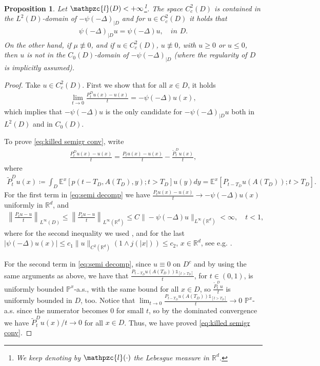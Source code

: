 \documentclass[reqno]{amsart}
\newtheorem{proposition}[theorem]{Proposition}
\theoremstyle{remark}
\numberwithin{equation}{section} %
\newcommand{\R}{\mathbb{R}}
\newcommand{\Lpsi}{\psi(-\Delta)}
\newcommand{\LpsiD}{\Lpsi_{|D}}
\newcommand{\wt}{\widetilde}
\newcommand{\1}{\mathds{1}}
\begin{document}
	\begin{proposition}\label{p:generator domain}
		Let $\mathpzc{l}(D)<+\infty$\footnote{We keep denoting by $\mathpzc{l}(\cdot)$ the Lebesgue measure in $\R^d$.}. The space $C_c^2(D)$ is contained in the $L^2(D)$-domain of $-\LpsiD$ and for $u\in C_c^2(D)$ it holds that
		\begin{align*}
			\LpsiD u=\Lpsi u,\quad \textit{in $D$}.
		\end{align*}
		On the other hand, if $\mu\not\equiv0$, and if $u\in C_c^2(D)$, $u\not\equiv 0$, with $u\ge0$ or $u\le 0$, then $u$ is not in the $C_0(D)$-domain of $-\LpsiD$ (where the regularity of $D$ is implicitly assumed).
	\end{proposition}
	\begin{proof}
		Take $u\in C_c^2(D)$. First we show that for all $x\in D$, it holds
		\begin{align}\label{eq:killed semigr conv}
			\lim_{t\to0}\frac{ P^D_tu(x)-u(x)}{t}=-\Lpsi u(x),
		\end{align}
		which implies that $-\Lpsi u$ is the only candidate for $-\LpsiD u$ both in $L^2(D)$ and in $C_0(D)$.
		
		To prove \eqref{eq:killed semigr conv}, write
		\begin{align}\label{eq:semi decomp}
			\frac{ P^D_tu(x)-u(x)}{t}=\frac{P_tu(x)-u(x)}{t}-\frac{\wt  P^D_tu(x)}{t},
		\end{align}
		where
		\begin{align}\label{eq:remainder of semigr}
			\wt  P^D_tu(x)\coloneqq \int_D \mathds{E}^x\left[p(t-T_D,A({T_D}),y);t>T_D\right]u(y)dy=\mathds{E}^x\left[P_{t-T_D}u(A({T_D}));t>T_D\right].
		\end{align}
		For the first term in \eqref{eq:semi decomp} we have $	\frac{P_tu(x)-u(x)}{t}\to -\Lpsi u(x)$ uniformly in $\mathbb{R}^d$, and 
		\begin{align}
			\left\|\frac{P_tu-u}{t}\right\|_{L^\infty(D)}\le 	\left\|\frac{P_tu-u}{t}\right\|_{L^\infty(\mathbb{R}^d)}\le C \|-\Lpsi u\|_{L^\infty(\mathbb{R}^d)}<\infty,\quad t<1,
		\end{align}
		where for the second inequality we used \cite[Eq. (15.3)]{bernstein}, and for the last $|\Lpsi u(x)|\le c_1\|u\|_{C^2(\mathbb{R}^d)}(1\wedge j(|x|))\le c_2$, $x\in \mathbb{R}^d$, see e.g. \cite[Eq. (6)]{Bio22}.
		
		For the second term in \eqref{eq:semi decomp}, since $u\equiv 0$ on $D^c$ and by using the same arguments as above, we have that $\frac{P_{t-T_D}u(A({T_D}))\mathds{1}_{[t>T_D]}}{t}$, for $t\in(0,1)$,
		is uniformly bounded $\mathds{P}^x$-a.s.,  with the same bound for all $x\in D$, so $\frac{ \widetilde{P}^D_tu}{t}$ is uniformly bounded in $D$, too. Notice that $\lim_{t\to0}\frac{P_{t-T_D}u(A({T_D}))\mathds{1}_{[t>T_D]}}{t}\to 0$  $\mathds{P}^x$-a.s. since the numerator becomes 0 for small $t$, so by the dominated convergence we have $\widetilde{P}^D_tu(x)/t\to0$ for all $x\in D$. Thus, we have proved \eqref{eq:killed semigr conv}.
		

\end{proof}
\end{document}
